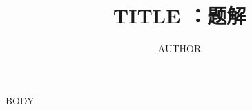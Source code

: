 \documentclass[UTF8,fontset=none,zihao=-4]{ctexart}
\title{ {{TITLE}} ：题解}
\author{ {{AUTHOR}} }
\date{}
\begin{document}
\maketitle
{{BODY}}
\end{document}
